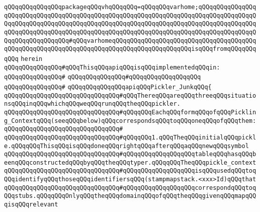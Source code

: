 \verb|qQQqqQQqqQQqqQQqpackageqQQqvhqQQqqQQq=qQQqqQQqvarhome;qQQqqQQqqQQqqQQqqQQqqQQqqQQqqQQqqQQqqQQqqQQqqQQqqQQqqQQqqQQqqQQqqQQqqQQqqQQqqQQqqQQqqQQqqQQqqQQqqQQqqQQqqQQqqQQqqQQqqQQqqQQqqQQqqQQqqQQqqQQqqQQqqQQqqQQqqQQqqQQqqQQqqQQqqQQqqQQqqQQqqQQqqQQqqQQqqQQqqQQqqQQqqQQqqQQqqQQqqQQqqQQqqQQqqQQqqQQqqQQqqQQq#qQQqvarhomeqQQqqQQqqQQqqQQqqQQqqQQqqQQqqQQqqQQqqQQqqQQqqQQqqQQqqQQqqQQqqQQqqQQqqQQqqQQqqQQqqQQqqQQqqQQqisqQQqfromqQQqqQQqqQQq|\newline
\verb|herein|\newline
\newline
\verb|qQQqqQQqqQQqqQQq#qQQqThisqQQqapiqQQqisqQQqimplementedqQQqin:|\newline
\verb|qQQqqQQqqQQqqQQq#|\newline
\verb|qQQqqQQqqQQqqQQq#qQQqqQQqqQQqqQQqqQQq|\newline
\verb|qQQqqQQqqQQqqQQq#|\newline
\verb|qQQqqQQqqQQqqQQqapiqQQqPickler_JunkqQQq{|\newline
\newline
\verb|qQQqqQQqqQQqqQQqqQQqqQQqqQQqqQQq#qQQqThereqQQqareqQQqthreeqQQqsituationsqQQqinqQQqwhichqQQqweqQQqrunqQQqtheqQQqpickler.|\newline
\verb|qQQqqQQqqQQqqQQqqQQqqQQqqQQqqQQq#qQQqqQQqEachqQQqformqQQqofqQQqPickling_ContextqQQq(seeqQQqbelow)qQQqcorrespondsqQQqtoqQQqoneqQQqofqQQqthem:|\newline
\verb|qQQqqQQqqQQqqQQqqQQqqQQqqQQqqQQq#|\newline
\verb|qQQqqQQqqQQqqQQqqQQqqQQqqQQqqQQq#qQQqqQQq1.qQQqTheqQQqinitialqQQqpickle.qQQqqQQqThisqQQqisqQQqdoneqQQqrightqQQqafterqQQqaqQQqnewqQQqsymbol|\newline
\verb|qQQqqQQqqQQqqQQqqQQqqQQqqQQqqQQq#qQQqqQQqqQQqqQQqqQQqtableqQQqhasqQQqbeenqQQqconstructedqQQqbyqQQqtheqQQqtyper.qQQqqQQqTheqQQqpickle_context|\newline
\verb|qQQqqQQqqQQqqQQqqQQqqQQqqQQqqQQq#qQQqqQQqqQQqqQQqqQQqisqQQqusedqQQqtoqQQqidentifyqQQqthoseqQQqidentifiersqQQq(stampmapstack.<xxx>Id)qQQqthat|\newline
\verb|qQQqqQQqqQQqqQQqqQQqqQQqqQQqqQQq#qQQqqQQqqQQqqQQqqQQqcorrespondqQQqtoqQQqstubs.qQQqqQQqOnlyqQQqtheqQQqdomainqQQqofqQQqtheqQQqgivenqQQqmapqQQqisqQQqrelevant|\newline
